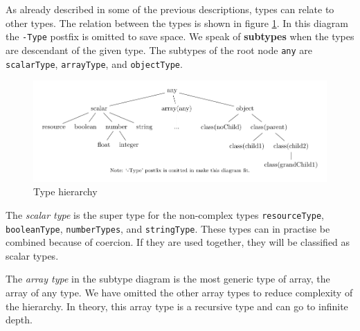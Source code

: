 \documentclass[../main.tex]{subfiles}
\begin{document}
    As already described in some of the previous descriptions, types can relate to other types.
    The relation between the types is shown in figure \ref{fig:type_hierarchie}.
    In this diagram the \texttt{-Type} postfix is omitted to save space.
    We speak of \textbf{subtypes} when the types are descendant of the given type.
    The subtypes of the root node \texttt{any} are \texttt{scalarType}, \texttt{arrayType}, and \texttt{objectType}.
    
    \begin{figure}[H]
        \includegraphics{Diagrams/Subtypes.pdf}
        \caption{Type hierarchy}
        \label{fig:type_hierarchie}
    \end{figure}
    

    The \textit{scalar type} is the super type for the non-complex types \texttt{resourceType}, \texttt{booleanType}, \texttt{numberTypes}, and \texttt{stringType}.
    These types can in practise be combined because of coercion.
    If they are used together, they will be classified as scalar types.
    
	The \textit{array type} in the subtype diagram is the most generic type of array, the array of any type.
	We have omitted the other array types to reduce complexity of the hierarchy.
	In theory, this array type is a recursive type and can go to infinite depth.
 
\end{document}
